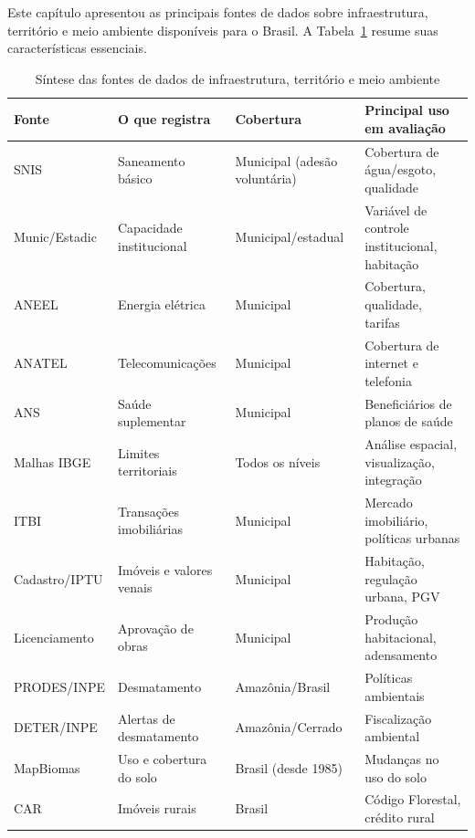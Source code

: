 Este capítulo apresentou as principais fontes de dados sobre infraestrutura, território e meio ambiente disponíveis para o Brasil. A Tabela~\ref{tab:sintese_cap9} resume suas características essenciais.

\begin{table}[H]
\centering
\caption{Síntese das fontes de dados de infraestrutura, território e meio ambiente}
\label{tab:sintese_cap9}
\small
\begin{tabularx}{\textwidth}{@{} >{\raggedright\arraybackslash}p{2.8cm} >{\raggedright\arraybackslash}p{3cm} >{\raggedright\arraybackslash}p{2.5cm} X @{}}
\toprule
\textbf{Fonte} & \textbf{O que registra} & \textbf{Cobertura} &
\textbf{Principal uso em avaliação} \\
\midrule
SNIS         & Saneamento básico           & Municipal (adesão voluntária) & Cobertura de água/esgoto, qualidade \\
Munic/Estadic & Capacidade institucional   & Municipal\slash \allowbreak estadual & Variável de controle institucional, habitação \\
ANEEL        & Energia elétrica            & Municipal          & Cobertura, qualidade, tarifas \\
ANATEL       & Telecomunicações            & Municipal          & Cobertura de internet e telefonia \\
ANS          & Saúde suplementar           & Municipal          & Beneficiários de planos de saúde \\
Malhas IBGE  & Limites territoriais        & Todos os níveis    & Análise espacial, visualização, integração \\
ITBI         & Transações imobiliárias     & Municipal          & Mercado imobiliário, políticas urbanas \\
Cadastro/IPTU & Imóveis e valores venais   & Municipal          & Habitação, regulação urbana, PGV \\
Licenciamento & Aprovação de obras          & Municipal          & Produção habitacional, adensamento \\
PRODES/INPE  & Desmatamento                & Amazônia\slash \allowbreak Brasil    & Políticas ambientais \\
DETER/INPE   & Alertas de desmatamento     & Amazônia\slash \allowbreak Cerrado   & Fiscalização ambiental \\
MapBiomas    & Uso e cobertura do solo     & Brasil (desde 1985) & Mudanças no uso do solo \\
CAR          & Imóveis rurais              & Brasil             & Código Florestal, crédito rural \\
\bottomrule
\end{tabularx}
\end{table}

